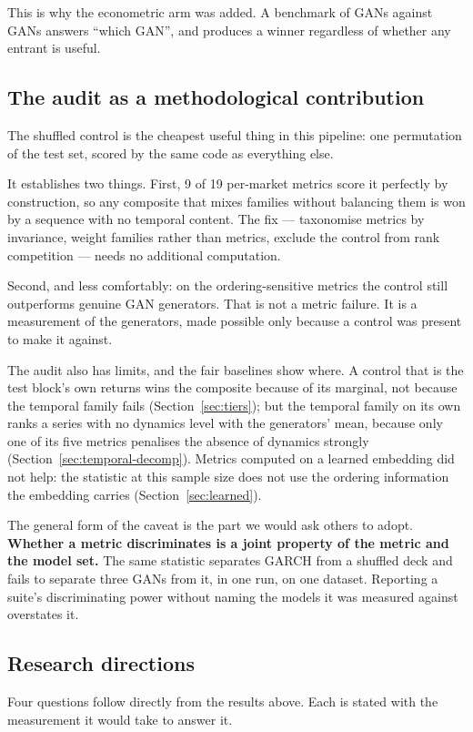 \documentclass[11pt,a4paper]{article}
\makeatletter
\DeclareRobustCommand{\_}{\ifmmode\nfss@text{\textunderscore}\else\textunderscore\allowbreak\fi}
\makeatother
\begin{document}
This is why the econometric arm was added. A benchmark of GANs against GANs answers ``which GAN'', and produces a winner regardless of whether any entrant is useful.

\subsection{The audit as a methodological contribution}
The shuffled control is the cheapest useful thing in this pipeline: one permutation of the test set, scored by the same code as everything else.

It establishes two things. First, 9 of 19 per-market metrics score it perfectly by construction, so any composite that mixes families without balancing them is won by a sequence with no temporal content. The fix --- taxonomise metrics by invariance, weight families rather than metrics, exclude the control from rank competition --- needs no additional computation.

Second, and less comfortably: on the ordering-sensitive metrics the control still outperforms genuine GAN generators. That is not a metric failure. It is a measurement of the generators, made possible only because a control was present to make it against.

The audit also has limits, and the fair baselines show where. A control that is the test block's own returns wins the composite because of its marginal, not because the temporal family fails (Section~\ref{sec:tiers}); but the temporal family on its own ranks a series with no dynamics level with the generators' mean, because only one of its five metrics penalises the absence of dynamics strongly (Section~\ref{sec:temporal-decomp}). Metrics computed on a learned embedding did not help: the statistic at this sample size does not use the ordering information the embedding carries (Section~\ref{sec:learned}).

The general form of the caveat is the part we would ask others to adopt. \textbf{Whether a metric discriminates is a joint property of the metric and the model set.} The same statistic separates GARCH from a shuffled deck and fails to separate three GANs from it, in one run, on one dataset. Reporting a suite's discriminating power without naming the models it was measured against overstates it.

\subsection{Research directions}
\label{sec:directions}
Four questions follow directly from the results above. Each is stated with the measurement it would take to answer it.
\end{document}
